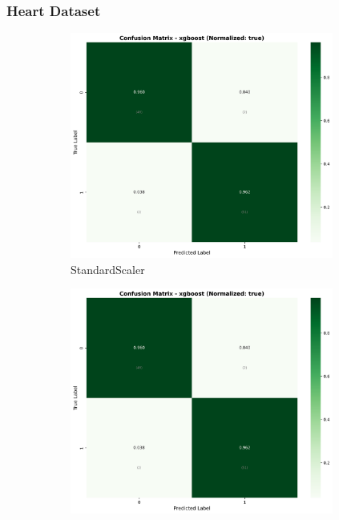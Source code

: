 \FloatBarrier

\subsubsection{Heart Dataset}\label{subsubsec:xgb-heart}

\begin{figure}[H]
\centering
\begin{subfigure}[b]{0.31\textwidth}\centering
\includegraphics[width=0.95\textwidth]{Result/heart_dataset/confusion_matrices/xgboost_numeric_dataset_StandardScaler.png}
\caption{StandardScaler}\label{fig:xgb_heart_cm_standard}
\end{subfigure}\hfill
\begin{subfigure}[b]{0.31\textwidth}\centering
\includegraphics[width=0.95\textwidth]{Result/heart_dataset/confusion_matrices/xgboost_numeric_dataset_MinMaxScaler.png}

\end{subfigure}
\end{figure}
